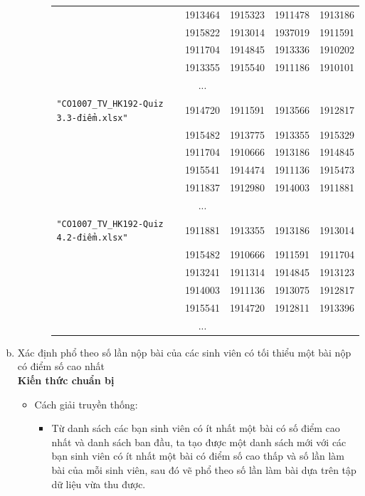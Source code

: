 \documentclass[a4paper]{article}
\theoremstyle{definition}
\begin{document}
\begin{enumerate}[a)]
\begin{itemize}
\begin{itemize}
\begin{center}
\begin{tabular}{l c c c c}
                     & 1913464 & 1915323 & 1911478 & 1913186\\
                     & 1915822 & 1913014 & 1937019 & 1911591\\
                     & 1911704 & 1914845 & 1913336 & 1910202\\
                     & 1913355 & 1915540 & 1911186 & 1910101\\
                     & ...\\
                     \texttt{"CO1007\_TV\_HK192-Quiz 3.3-điểm.xlsx"} & 1914720 & 1911591 & 1913566 & 1912817\\
                     & 1915482 & 1913775 & 1913355 & 1915329\\
                     & 1911704 & 1910666 & 1913186 & 1914845\\
                     & 1915541 & 1914474 & 1911136 & 1915473\\
                     & 1911837 & 1912980 & 1914003 & 1911881\\
                     & ...\\
                     \texttt{"CO1007\_TV\_HK192-Quiz 4.2-điểm.xlsx"} & 1911881 & 1913355 & 1913186 & 1913014\\
                     & 1915482 & 1910666 & 1911591 & 1911704\\
                     & 1913241 & 1911314 & 1914845 & 1913123\\
                     & 1914003 & 1911136 & 1913075 & 1912817\\
                     & 1915541 & 1914720 & 1912811 & 1913396\\
                     & ...
                \end{tabular}
            \end{center}
        \end{itemize}
    \end{itemize}
    \bf\item {Xác định phổ theo số lần nộp bài của các sinh viên có tối thiểu một bài nộp có điểm số cao nhất}\\[6pt]
    \bf Kiến thức chuẩn bị\normalfont
    \begin{itemize}
        \item Cách giải truyền thống:
        \begin{itemize}
            \item Từ danh sách các bạn sinh viên có ít nhất một bài có số điểm cao nhất và danh sách ban đầu, ta tạo được một danh sách mới với các bạn sinh viên có ít nhất một bài có điểm số cao thấp và số lần làm bài của mỗi sinh viên, sau đó vẽ phổ theo số lần làm bài dựa trên tập dữ liệu vừa thu được.

\end{itemize}
\end{itemize}
\end{enumerate}
\end{document}
